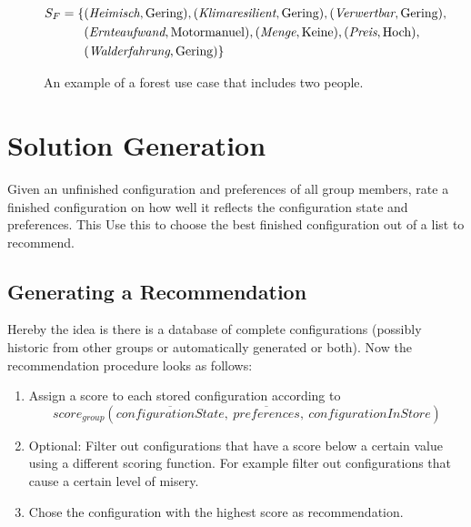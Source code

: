 \begin{figure}
\begin{mdframed}[frametitle={Example for Forest Use Case}]
\begin{align}
            \begin{split}
            S_F  =  \{ & (\textit{Heimisch}, \text{Gering}), (\textit{Klimaresilient}, \text{Gering}), (\textit{Verwertbar}, \text{Gering}), \\
            & (\textit{Ernteaufwand}, \text{Motormanuel}),
            (\textit{Menge}, \text{Keine}), (\textit{Preis}, \text{Hoch}),\\ 
            & (\textit{Walderfahrung}, \text{Gering}) \} 
            \end{split} \notag
        \end{align}
    \end{mdframed}
    \caption{An example of a forest use case that includes two people.}
    \label{fig:Concept:ForestExample}
    \end{figure}


\section{Solution Generation}
\label{sec:Concept:SolutionGeneration}

Given an unfinished configuration and preferences of all group members, rate a finished configuration on how well it reflects the configuration state and preferences. This Use this to choose the best finished configuration out of a list to recommend.

\subsection{Generating a Recommendation}

Hereby the idea is there is a database of complete configurations (possibly historic from other groups or automatically generated or both).
Now the recommendation procedure looks as follows:

\begin{enumerate}
    \item Assign a score to each stored configuration according to $$score_{group}(\overline{configurationState},\ \overline{preferences}, \ configurationInStore)$$
    \item Optional: Filter out configurations that have a score below a certain value using a different scoring function. For example filter out configurations that cause a certain level of misery.
    \item Chose the configuration with the highest score as recommendation.
\end{enumerate}

